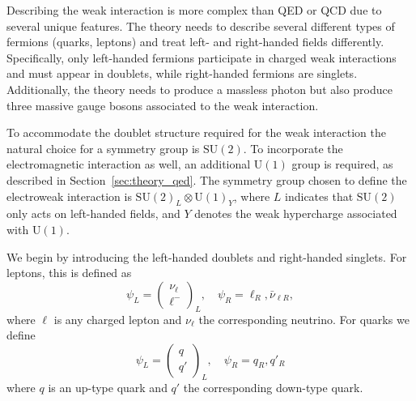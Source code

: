 Describing the weak interaction is more complex than QED or QCD due to several unique features. The theory needs to describe several different types of fermions (quarks, leptons) and treat left- and right-handed fields differently. Specifically, only left-handed fermions participate in charged weak interactions and must appear in doublets, while right-handed fermions are singlets. Additionally, the theory needs to produce a massless photon but also produce three massive gauge bosons associated to the weak interaction. 

To accommodate the doublet structure required for the weak interaction the natural choice for a symmetry group is $\mathrm{SU}(2)$. To incorporate the electromagnetic interaction as well, an additional $\mathrm{U}(1)$ group is required, as described in Section~\ref{sec:theory_qed}. The symmetry group chosen to define the electroweak interaction is $\mathrm{SU}{(2)}_{L} \otimes \mathrm{U}{(1)}_{Y}$, where $L$ indicates that $\mathrm{SU}(2)$ only acts on left-handed fields, and $Y$ denotes the weak hypercharge associated with $\mathrm{U}(1)$. 

We begin by introducing the left-handed doublets and right-handed singlets. For leptons, this is defined as
\begin{equation}
  \psi_{L} = \begin{pmatrix}
    \nu_{\ell} \\
    \ell^{-}
  \end{pmatrix}_{L}, \quad
  \psi_{R} = \ell_{R}, \bar{\nu}_{\ell R},
  \label{eq:ew_lepton_fields}
\end{equation}
where $\ell$ is any charged lepton and $\nu_{\ell}$ the corresponding neutrino. For quarks we define
\begin{equation}
  \psi_{L} = \begin{pmatrix}
    q \\
    q'
  \end{pmatrix}_{L}, \quad
  \psi_{R} = q_{R}, q'_{R}
  \label{eq:ew_quark_fields}
\end{equation}
where $q$ is an up-type quark and $q'$ the corresponding down-type quark. 

